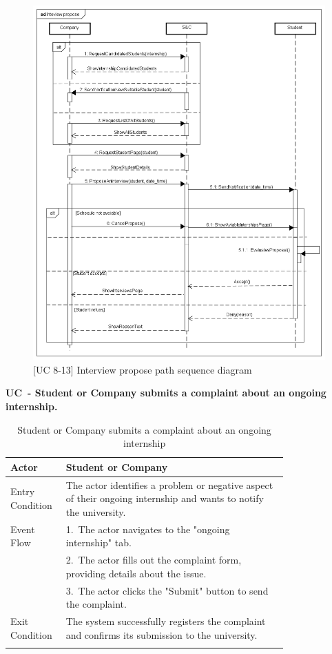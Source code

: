 \begin{figure}[H]
    \centering
    \includegraphics[width=1\linewidth]{Images/Sequence diagrams/Inteview propose.png}
    \caption{[UC 8-13] Interview propose path sequence diagram}
    \label{fig:enter-label}
\end{figure}

\newpage

\textbf{UC\cuc\  - Student or Company submits a complaint about an ongoing internship.}

\begin{center} 
    \renewcommand{\arraystretch}{1.2} 
    \begin{longtable}{ l p{0.8\linewidth} } 
        \hline Actor & Student or Company \\ \hline 
        Entry Condition & The actor identifies a problem or negative aspect of their ongoing internship and wants to notify the university. \\ \hline 
        Event Flow & 1.\ The actor navigates to the "ongoing internship" tab. \\  
        & 2.\ The actor fills out the complaint form, providing details about the issue. \\ 
        & 3.\ The actor clicks the "Submit" button to send the complaint. \\ \hline 
        Exit Condition & The system successfully registers the complaint and confirms its submission to the university. \\ \hline
        \caption{Student or Company submits a complaint about an ongoing internship} 
        \label{tab:student_complaint_uc} 
    \end{longtable} 
\end{center}

